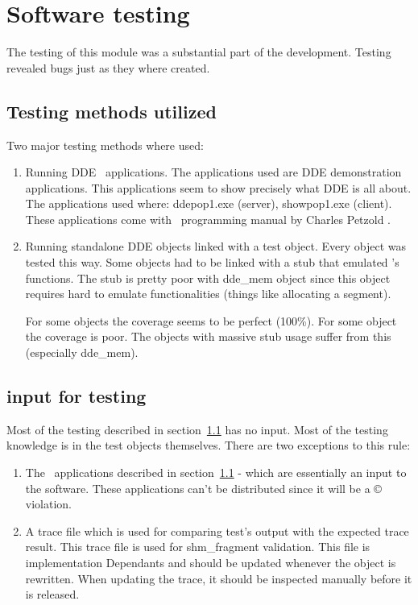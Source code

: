 \section{Software testing}
The testing of this module was a substantial part of the
development. Testing revealed bugs just as they where created.

\subsection{Testing methods utilized}
\label{sec:TestMethod}
Two major testing methods where used:
\begin{enumerate}
  \item Running DDE \windoz\ applications. The applications used are
    DDE demonstration applications. This applications seem to show 
    precisely what DDE is all about. The applications used where:
    ddepop1.exe (server), showpop1.exe (client). These
    applications come with \windoz\ programming manual by Charles
    Petzold \cite{bib:WinManual}. 
  \item Running standalone DDE objects linked with a test
    object. Every object was tested this way. Some objects had to be
    linked with a stub that emulated \Wine's functions. The stub is
    pretty poor with dde\_mem object since this object requires hard
    to emulate functionalities (things like allocating a segment).

    For some objects the coverage seems to be perfect (100\%). For
    some object the coverage is poor. The objects with massive stub
    usage suffer from this (especially dde\_mem).
\end{enumerate}

\subsection{input for testing}
Most of the testing described in section~\ref{sec:TestMethod} has no
input. Most of the testing knowledge is in the test objects
themselves. There are two exceptions to this rule:
\begin{enumerate}
  \item The \windoz\ applications described in
    section~\ref{sec:TestMethod} - which are essentially an input to
    the software. These applications can't be distributed since it
    will be a \copyright{} violation.
  \item A trace file which is used for comparing test's output with
    the expected trace result. This trace file is used for
    shm\_fragment validation. This file is implementation Dependants
    and should be updated whenever the object is rewritten. When
    updating the trace, it should be inspected manually before it is
    released. 
\end{enumerate}

